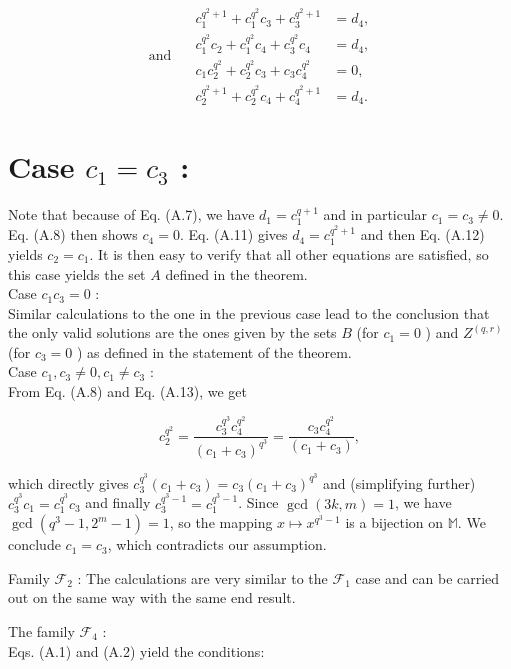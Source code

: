 \documentclass[10pt]{article}
\begin{document}
\[
\text { and } \quad \begin{align*}
c_{1}^{q^{2}+1}+c_{1}^{q^{2}} c_{3}+c_{3}^{q^{2}+1} & =d_{4}, \\
c_{1}^{q^{2}} c_{2}+c_{1}^{q^{2}} c_{4}+c_{3}^{q^{2}} c_{4} & =d_{4}, \\
c_{1} c_{2}^{q^{2}}+c_{2}^{q^{2}} c_{3}+c_{3} c_{4}^{q^{2}} & =0, \\
c_{2}^{q^{2}+1}+c_{2}^{q^{2}} c_{4}+c_{4}^{q^{2}+1} & =d_{4} . \tag{A.14}
\end{align*}
\]

\section*{Case $c_{1}=c_{3}$ :}
Note that because of Eq. (A.7), we have $d_{1}=c_{1}^{q+1}$ and in particular $c_{1}=c_{3} \neq 0$. Eq. (A.8) then shows $c_{4}=0$. Eq. (A.11) gives $d_{4}=c_{1}^{q^{2}+1}$ and then Eq. (A.12) yields $c_{2}=c_{1}$. It is then easy to verify that all other equations are satisfied, so this case yields the set $A$ defined in the theorem.\\
Case $c_{1} c_{3}=0$ :\\
Similar calculations to the one in the previous case lead to the conclusion that the only valid solutions are the ones given by the sets $B$ (for $c_{1}=0$ ) and $Z^{(q, r)}$ (for $c_{3}=0$ ) as defined in the statement of the theorem.\\
Case $c_{1}, c_{3} \neq 0, c_{1} \neq c_{3}$ :\\
From Eq. (A.8) and Eq. (A.13), we get

$$
c_{2}^{q^{2}}=\frac{c_{3}^{q^{3}} c_{4}^{q^{2}}}{\left(c_{1}+c_{3}\right)^{q^{3}}}=\frac{c_{3} c_{4}^{q^{2}}}{\left(c_{1}+c_{3}\right)},
$$

which directly gives $c_{3}^{q^{3}}\left(c_{1}+c_{3}\right)=c_{3}\left(c_{1}+c_{3}\right)^{q^{3}}$ and (simplifying further) $c_{3}^{q^{3}} c_{1}=c_{1}^{q^{3}} c_{3}$ and finally $c_{3}^{q^{3}-1}=c_{1}^{q^{3}-1}$. Since $\operatorname{gcd}(3 k, m)=1$, we have $\operatorname{gcd}\left(q^{3}-1,2^{m}-1\right)=1$, so the mapping $x \mapsto x^{q^{3}-1}$ is a bijection on $\mathbb{M}$. We conclude $c_{1}=c_{3}$, which contradicts our assumption.

Family $\mathcal{F}_{2}$ : The calculations are very similar to the $\mathcal{F}_{1}$ case and can be carried out on the same way with the same end result.

The family $\mathcal{F}_{4}$ :\\
Eqs. (A.1) and (A.2) yield the conditions:
\end{document}
